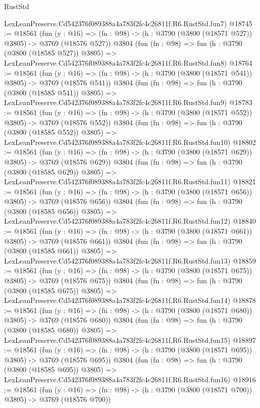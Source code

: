 \begin{lexlean}{RustStd}
\begin{coremodule}
    LexLeanPreserve.Cd542376f089388a4a783f2fc4c26811f.R6.RustStd.fun7)
@18745 := @18561
    (fun (y : @16) => (fn : @98) -> (h : @3790 (@3800 (@18571 @527)) @3805) -> @3769 (@18576 @527))
    @3804
    (fun (fn : @98) =>
    fun (h : @3790 (@3800 (@18585 @527)) @3805) =>
    LexLeanPreserve.Cd542376f089388a4a783f2fc4c26811f.R6.RustStd.fun8)
@18764 := @18561
    (fun (y : @16) => (fn : @98) -> (h : @3790 (@3800 (@18571 @541)) @3805) -> @3769 (@18576 @541))
    @3804
    (fun (fn : @98) =>
    fun (h : @3790 (@3800 (@18585 @541)) @3805) =>
    LexLeanPreserve.Cd542376f089388a4a783f2fc4c26811f.R6.RustStd.fun9)
@18783 := @18561
    (fun (y : @16) => (fn : @98) -> (h : @3790 (@3800 (@18571 @552)) @3805) -> @3769 (@18576 @552))
    @3804
    (fun (fn : @98) =>
    fun (h : @3790 (@3800 (@18585 @552)) @3805) =>
    LexLeanPreserve.Cd542376f089388a4a783f2fc4c26811f.R6.RustStd.fun10)
@18802 := @18561
    (fun (y : @16) => (fn : @98) -> (h : @3790 (@3800 (@18571 @629)) @3805) -> @3769 (@18576 @629))
    @3804
    (fun (fn : @98) =>
    fun (h : @3790 (@3800 (@18585 @629)) @3805) =>
    LexLeanPreserve.Cd542376f089388a4a783f2fc4c26811f.R6.RustStd.fun11)
@18821 := @18561
    (fun (y : @16) => (fn : @98) -> (h : @3790 (@3800 (@18571 @656)) @3805) -> @3769 (@18576 @656))
    @3804
    (fun (fn : @98) =>
    fun (h : @3790 (@3800 (@18585 @656)) @3805) =>
    LexLeanPreserve.Cd542376f089388a4a783f2fc4c26811f.R6.RustStd.fun12)
@18840 := @18561
    (fun (y : @16) => (fn : @98) -> (h : @3790 (@3800 (@18571 @661)) @3805) -> @3769 (@18576 @661))
    @3804
    (fun (fn : @98) =>
    fun (h : @3790 (@3800 (@18585 @661)) @3805) =>
    LexLeanPreserve.Cd542376f089388a4a783f2fc4c26811f.R6.RustStd.fun13)
@18859 := @18561
    (fun (y : @16) => (fn : @98) -> (h : @3790 (@3800 (@18571 @675)) @3805) -> @3769 (@18576 @675))
    @3804
    (fun (fn : @98) =>
    fun (h : @3790 (@3800 (@18585 @675)) @3805) =>
    LexLeanPreserve.Cd542376f089388a4a783f2fc4c26811f.R6.RustStd.fun14)
@18878 := @18561
    (fun (y : @16) => (fn : @98) -> (h : @3790 (@3800 (@18571 @680)) @3805) -> @3769 (@18576 @680))
    @3804
    (fun (fn : @98) =>
    fun (h : @3790 (@3800 (@18585 @680)) @3805) =>
    LexLeanPreserve.Cd542376f089388a4a783f2fc4c26811f.R6.RustStd.fun15)
@18897 := @18561
    (fun (y : @16) => (fn : @98) -> (h : @3790 (@3800 (@18571 @695)) @3805) -> @3769 (@18576 @695))
    @3804
    (fun (fn : @98) =>
    fun (h : @3790 (@3800 (@18585 @695)) @3805) =>
    LexLeanPreserve.Cd542376f089388a4a783f2fc4c26811f.R6.RustStd.fun16)
@18916 := @18561
    (fun (y : @16) => (fn : @98) -> (h : @3790 (@3800 (@18571 @700)) @3805) -> @3769 (@18576 @700))

\end{coremodule}
\end{lexlean}

